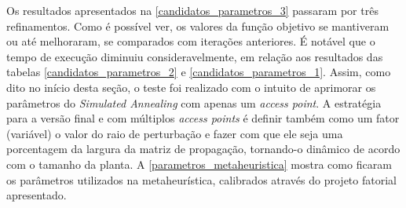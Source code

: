 \documentclass[
	12pt,				%
	twoside,			%
	a4paper,			%
	english,			%
	french,				%
	spanish,			%
	brazil				%
	]{abntex2}
\begin{document}
\begin{table}[ht]
\centering
\caption{Métricas coletadas para a combinação de níveis dos parâmetros da terceira iteração.}
\label{candidatos_parametros_3}
\end{table}

Os resultados apresentados na \autoref{candidatos_parametros_3} passaram
por três refinamentos. Como é possível ver, os valores da função
objetivo se mantiveram ou até melhoraram, se comparados com iterações
anteriores. É notável que o tempo de execução diminuiu
consideravelmente, em relação aos resultados das tabelas
\ref{candidatos_parametros_2} e \ref{candidatos_parametros_1}. Assim,
como dito no início desta seção, o teste foi realizado com o intuito de
aprimorar os parâmetros do \emph{Simulated Annealing} com apenas um
\emph{access point}. A estratégia para a versão final e com múltiplos
\emph{access points} é definir também como um fator (variável) o valor
do raio de perturbação e fazer com que ele seja uma porcentagem da
largura da matriz de propagação, tornando-o dinâmico de acordo com o
tamanho da planta. A \autoref{parametros_metaheuristica} mostra como
ficaram os parâmetros utilizados na metaheurística, calibrados através
do projeto fatorial apresentado.
\end{document}
